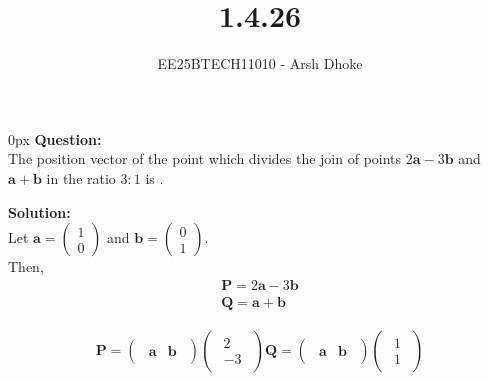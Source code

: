 \documentclass[journal]{IEEEtran}
\renewcommand{\vec}[1]{\mathbf{#1}}
\newcommand{\solution}{\textbf{Solution: }}
\newcommand{\brak}[1]{\begin{pmatrix}#1\end{pmatrix}}
\begin{document}

\vspace{3cm}

\title{1.4.26}
\author{EE25BTECH11010 - Arsh Dhoke}
{\let\newpage\relax\maketitle}

\renewcommand{\thefigure}{\theenumi}
\renewcommand{\thetable}{\theenumi}
\setlength{\intextsep}{10pt}

\parindent 0px
\textbf{Question:} \\
The position vector of the point which divides the join of points $2\vec{a} - 3\vec{b}$ and $\vec{a} + \vec{b}$ in the ratio $3:1$ is \underline{\hspace{2cm}}.

\solution \\

Let $\vec{a}=\brak{1\\0}$ and $\vec{b}=\brak{0\\1}$.\\
Then,
\begin{align}
    \vec{P}=2\vec{a}-3\vec{b}\\
    \vec{Q}=\vec{a}+\vec{b}
\end{align}

\begin{align}
\vec{P}=\brak{\begin{matrix}\vec{a} & \vec{b}\end{matrix}} \brak{\begin{matrix}2 \\[6pt]-3\end{matrix}}
\vec{Q}=\brak{\begin{matrix}\vec{a} & \vec{b}\end{matrix}} \brak{\begin{matrix}1 \\[6pt]1\end{matrix}}
\end{align}
\end{document}
